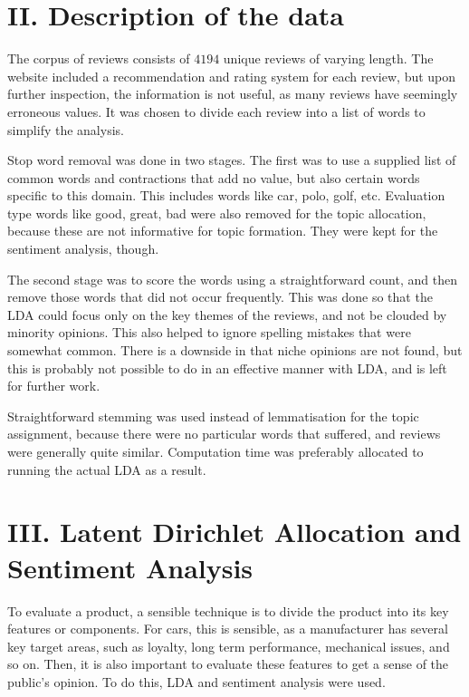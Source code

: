 \documentclass[onecolumn,prl,aps,10pt]{revtex4}
\begin{document}


\section{II. Description of the data}
The corpus of reviews consists of $4194$ unique reviews of varying length. The website included a recommendation and rating system for each review, but upon further inspection, the information is not useful, as many reviews have seemingly erroneous values. It was chosen to divide each review into a list of words to simplify the analysis.

Stop word removal was done in two stages. The first was to use a supplied list of common words and contractions that add no value, but also certain words specific to this domain. This includes words like car, polo, golf, etc. Evaluation type words like good, great, bad were also removed for the topic allocation, because these are not informative for topic formation. They were kept for the sentiment analysis, though.

The second stage was to score the words using a straightforward count, and then remove those words that did not occur frequently. This was done so that the LDA could focus only on the key themes of the reviews, and not be clouded by minority opinions. This also helped to ignore spelling mistakes that were somewhat common. There is a downside in that niche opinions are not found, but this is probably not possible to do in an effective manner with LDA, and is left for further work.

Straightforward stemming was used instead of lemmatisation for the topic assignment, because there were no particular words that suffered, and reviews were generally quite similar. Computation time was preferably allocated to running the actual LDA as a result. 

\section{III. Latent Dirichlet Allocation and Sentiment Analysis}
To evaluate a product, a sensible technique is to divide the product into its key features or components. For cars, this is sensible, as a manufacturer has several key target areas, such as loyalty, long term performance, mechanical issues, and so on. Then, it is also important to evaluate these features to get a sense of the public's opinion. To do this, LDA and sentiment analysis were used.
\end{document}
